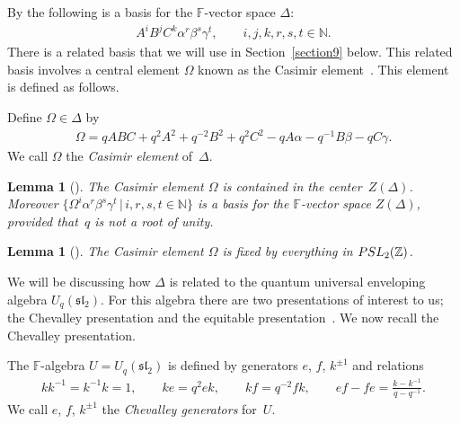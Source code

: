 \documentclass[11pt]{article}
\numberwithin{equation}{section}
\newtheorem{Lemma}[Theorem]{Lemma}
\begin{document}
By \cite[Theorem~4.1]{uaw} the following
is a basis for the $\mathbb F$-vector space $\Delta$:
\begin{gather*}
 A^iB^jC^k \alpha^r\beta^s\gamma^t,
\qquad
i,j,k,r,s,t \in \mathbb N.
\end{gather*}
There is a related basis
\cite[Theorem~7.5]{uaw} that we will use
 in
Section~\ref{section9} below. This related basis
involves
 a
central element $\Omega$ known as the Casimir
element~\cite[Lemma~6.1]{uaw}.
This element is def\/ined
as follows.


\begin{Definition}
\label{def:casdelta}
Def\/ine $\Omega \in \Delta$ by
\begin{gather*}
\Omega = qABC+q^2A^2+q^{-2}B^2+q^2 C^2 - q A\alpha  - q^{-1} B \beta
- q C \gamma.
\end{gather*}
We call $\Omega$ the {\it Casimir element} of~$\Delta$.
\end{Definition}

\begin{Lemma}[]
The Casimir element $\Omega$ is contained in the
center~$Z(\Delta)$.
Moreover
$\lbrace \Omega^i\alpha^r\beta^s\gamma^t \,|\, i,r,s,t \in \mathbb N\rbrace$
is a basis for
the $\mathbb F$-vector space
$Z(\Delta)$,
provided that~$q$ is not a root of unity.
\end{Lemma}

\begin{Lemma}[]
\label{lem:psl}
The Casimir element $\Omega$  is fixed by
everything in
${\rm  {PSL}}_2(\mathbb Z)$.
\end{Lemma}

We will be discussing how
$\Delta$ is related to the
quantum universal enveloping
algebra $U_q(\mathfrak{sl}_2)$.
For
this algebra
there are two presentations of
 interest to us;
 the Chevalley presentation
\cite[Section~1.1]{jantzen}
and the equitable presentation~\cite{equit}. We now recall the
  Chevalley presentation.


\begin{Definition}
\label{def:chev}
The
$\mathbb F$-algebra $U=U_q(\mathfrak{sl}_2)$
is def\/ined by generators
$e$, $f$, $k^{\pm 1 }$  and relations
\begin{gather*}
  k k^{-1} = k^{-1} k = 1,
\qquad
 ke = q^2 e k,
\qquad
 kf = q^{-2} f k,
\qquad ef-fe = \frac{k-k^{-1}}{q-q^{-1}}.
\end{gather*}
We call  $e$, $f$, $k^{\pm 1}$ the {\it Chevalley generators} for~$U$.
\end{Definition}
\end{document}

